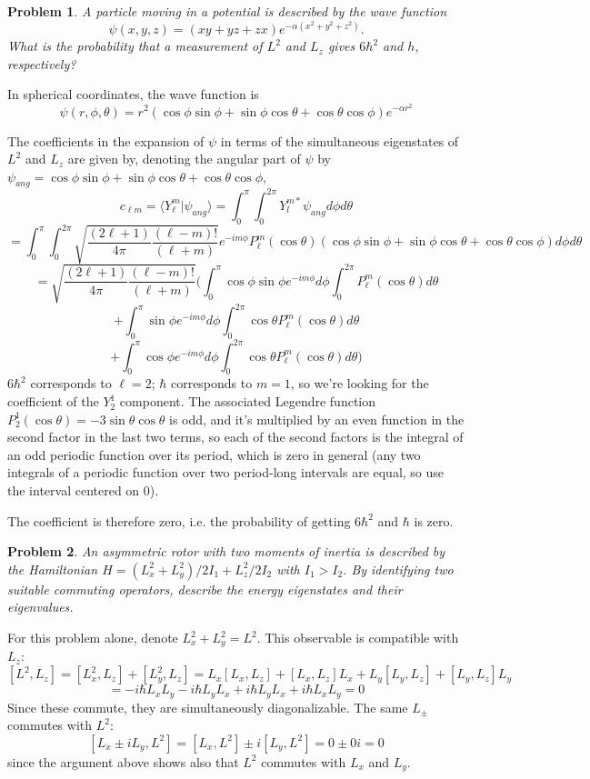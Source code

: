 \documentclass{article}
\newtheorem{prob}{Problem}
\begin{document}
\begin{prob}
  A particle moving in a potential is described by the wave function
  \[
    \psi(x,y,z) = (xy+yz+zx)e^{-\alpha(x^{2}+y^{2}+z^{2})}.
  \]
  What is the probability that a measurement of $L^{2}$ and $L_{z}$ gives $6\hbar^{2}$ and $h$, respectively?
\end{prob}

In spherical coordinates, the wave function is
\[
  \psi(r, \phi, \theta) = r^{2}(\cos\phi\sin\phi + \sin\phi\cos\theta + \cos\theta\cos\phi)e^{-\alpha r^{2}}
\]

The coefficients in the expansion of $\psi$ in terms of the simultaneous eigenstates of $L^{2}$ and $L_{z}$ are given by,
denoting the angular part of $\psi$ by  $\psi_{ang} = \cos\phi\sin\phi + \sin\phi\cos\theta + \cos\theta\cos\phi$,
\[
  c_{\ell m} = \langle Y_{\ell}^{m} |  \psi_{ang} \rangle = \int_{0}^{\pi}\int_{0}^{2\pi} Y_{l}^{m*} \psi_{ang} d\phi d\theta
\]
\[
  = \int_{0}^{\pi}\int_{0}^{2\pi}\sqrt{\frac{(2\ell + 1)}{4\pi}\frac{(\ell-m)!}{(\ell+m)}} e^{-im\phi}P_{\ell}^{m}(\cos\theta)
  (\cos\phi\sin\phi + \sin\phi\cos\theta + \cos\theta\cos\phi)d\phi d\theta
\]
\[
  = \sqrt{\frac{(2\ell + 1)}{4\pi}\frac{(\ell-m)!}{(\ell+m)}} \bigg(
  \int_{0}^{\pi}\cos\phi\sin\phi e^{-im\phi}d\phi\int_{0}^{2\pi}P_{\ell}^{m}(\cos\theta)d\theta
\]
\[
  + \int_{0}^{\pi}\sin\phi e^{-im\phi}d\phi\int_{0}^{2\pi}\cos\theta P_{\ell}^{m}(\cos\theta)d\theta
\]
\[
  + \int_{0}^{\pi}\cos\phi e^{-im\phi}d\phi\int_{0}^{2\pi}\cos\theta P_{\ell}^{m}(\cos\theta)d\theta \bigg)
\]
$6\hbar^{2}$ corresponds to $\ell = 2$; $\hbar$ corresponds to $m = 1$, so we're looking for the coefficient of the $Y_{2}^{1}$ component.
The associated Legendre function $P_{2}^{1}(\cos\theta) = -3\sin\theta\cos\theta$ is odd, and it's multiplied by an even function in the second factor
in the last two terms, so each of the second factors is the integral of an odd periodic function over its period, which is zero in general
(any two integrals of a periodic function over two period-long intervals are equal, so use the interval centered on 0).

The coefficient is therefore zero, i.e. the probability of getting $6\hbar^{2}$ and $\hbar$ is zero.

\begin{prob}
  An asymmetric rotor with two moments of inertia is described by the Hamiltonian $H = (L_{x}^{2} + L_{y}^{2}) / 2I_{1} + L_{z}^{2}/2I_{2}$ with $I_{1}>I_{2}$.
  By identifying two suitable commuting operators, describe the energy eigenstates and their eigenvalues.
\end{prob}

For this problem alone, denote $L_{x}^{2} + L_{y}^{2} = L^{2}$.
This observable is compatible with $L_{z}$:
\[
  [L^{2}, L_{z}] = [L_{x}^{2}, L_{z}] + [L_{y}^{2}, L_{z}]
  = L_{x}[L_{x}, L_{z}] + [L_{x}, L_{z}]L_{x} + L_{y}[L_{y}, L_{z}] + [L_{y}, L_{z}]L_{y}
\]
\[
  = -i\hbar L_{x}L_{y} - i\hbar L_{y}L_{x} + i\hbar L_{y}L_{x} + i\hbar L_{x}L_{y}
  = 0
\]
Since these commute, they are simultaneously diagonalizable.
The same $L_{\pm}$ commutes with $L^{2}$:
\[
  [L_{x}\pm iL_{y}, L^{2}] = [L_{x}, L^{2}] \pm i[L_{y}, L^{2}] = 0 \pm 0i = 0
\]
since the argument above shows also that $L^{2}$ commutes with $L_{x}$ and $L_{y}$.
\end{document}
